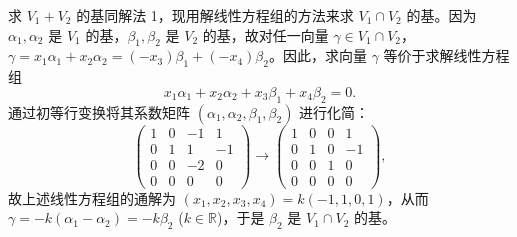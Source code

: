 \documentclass[lang=cn,12pt]{elegantbook}
\begin{document}
\begin{solution}[解法 2]
    求 \( V_1 + V_2 \) 的基同解法 1，现用解线性方程组的方法来求 \( V_1 \cap V_2 \) 的基。因为 \( \alpha_1, \alpha_2 \) 是 \( V_1 \) 的基，\( \beta_1, \beta_2 \) 是 \( V_2 \) 的基，故对任一向量 \( \gamma \in V_1 \cap V_2 \)，\( \gamma = x_1 \alpha_1 + x_2 \alpha_2 = (-x_3) \beta_1 + (-x_4) \beta_2 \)。因此，求向量 \( \gamma \) 等价于求解线性方程组
    \[ x_1 \alpha_1 + x_2 \alpha_2 + x_3 \beta_1 + x_4 \beta_2 = 0. \]
    通过初等行变换将其系数矩阵 \( (\alpha_1, \alpha_2, \beta_1, \beta_2) \) 进行化简：
    \[
\begin{pmatrix}
    1 & 0 & -1 & 1 \\
    0 & 1 & 1 & -1 \\
    0 & 0 & -2 & 0 \\
    0 & 0 & 0 & 0 
\end{pmatrix} \rightarrow 
\begin{pmatrix}
    1 & 0 & 0 & 1 \\
    0 & 1 & 0 & -1 \\
    0 & 0 & 1 & 0 \\
    0 & 0 & 0 & 0 
\end{pmatrix},
    \]
    故上述线性方程组的通解为 \( (x_1, x_2, x_3, x_4) = k(-1, 1, 0, 1) \)，从而 \( \gamma = -k(\alpha_1 - \alpha_2) = -k \beta_2 \) (\( k \in \mathbb{R} \))，于是 \( \beta_2 \) 是 \( V_1 \cap V_2 \) 的基。
\end{solution}


        
    
    
    
\end{document}
